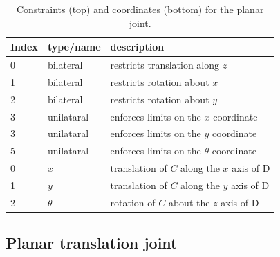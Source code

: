 \begin{table}[h]
\centering
\begin{tabular}{|l|l|l|}
\hline
Index & type/name & description \\
\hline
0 & bilateral & restricts translation along $z$ \\
1 & bilateral & restricts rotation about $x$ \\
2 & bilateral & restricts rotation about $y$ \\
3 & unilataral & enforces limits on the $x$ coordinate \\
3 & unilataral & enforces limits on the $y$ coordinate \\
5 & unilataral & enforces limits on the $\theta$ coordinate \\
\hline
\hline
0 & $x$ & translation of $C$ along the $x$ axis of D \\
1 & $y$ & translation of $C$ along the $y$ axis of D \\
2 & $\theta$ & rotation of $C$ about the $z$ axis of D\\
\hline
\end{tabular}
\caption{Constraints (top) and coordinates (bottom) for the planar joint.}
\label{PlanarConstraints:tbl}
\end{table}

\subsection{Planar translation joint}

